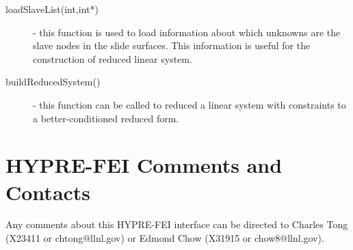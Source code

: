 \begin{description}
\item[loadSlaveList(int,int*)] - this function is used to load information
                        about which unknowns are the slave nodes in the
                        slide surfaces.  This information is useful for
                        the construction of reduced linear system.
\item[buildReducedSystem() ] - this function can be called to reduced a linear
                        system with constraints to a better-conditioned reduced
                        form.
\end{description}

\section{HYPRE-FEI Comments and Contacts}

Any comments about this HYPRE-FEI interface can be directed to Charles Tong
(X23411 or chtong@llnl.gov) or Edmond Chow (X31915 or chow8@llnl.gov).

